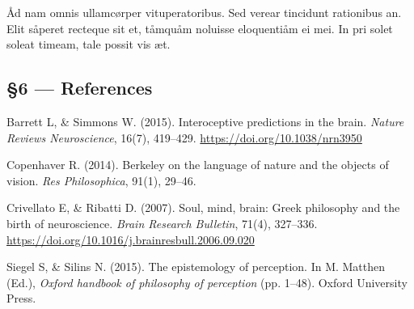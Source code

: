 \documentclass[
  12pt,
  british,
  a4paper,
]{article}
\begin{document}
Åd nam omnis ullamcørper vituperatoribus. Sed verear tincidunt
rationibus an. Elit såperet recteque sit et, tåmquåm noluisse
eloquentiåm ei mei. In pri solet soleat timeam, tale possit vis æt.

\hypertarget{references}{%
\subsection*{§6 --- References}\label{references}}

\hypertarget{refs}{}
\leavevmode\hypertarget{ref-barrett2015}{}%
Barrett L, \& Simmons W. (2015). Interoceptive predictions in the brain.
\emph{Nature Reviews Neuroscience}, 16(7), 419--429.
\url{https://doi.org/10.1038/nrn3950}

\leavevmode\hypertarget{ref-copenhaver2014}{}%
Copenhaver R. (2014). Berkeley on the language of nature and the objects
of vision. \emph{Res Philosophica}, 91(1), 29--46.

\leavevmode\hypertarget{ref-crivellato2007}{}%
Crivellato E, \& Ribatti D. (2007). Soul, mind, brain: Greek philosophy
and the birth of neuroscience. \emph{Brain Research Bulletin}, 71(4),
327--336. \url{https://doi.org/10.1016/j.brainresbull.2006.09.020}

\leavevmode\hypertarget{ref-siegel2015}{}%
Siegel S, \& Silins N. (2015). The epistemology of perception. In M.
Matthen (Ed.), \emph{Oxford handbook of philosophy of perception} (pp.
1--48). Oxford University Press.
\end{document}
